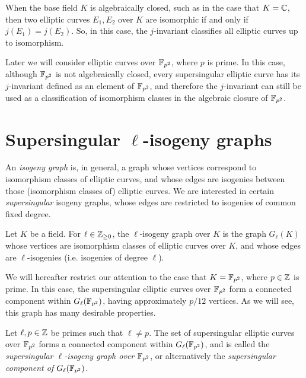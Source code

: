         When the base field $K$ is algebraically closed, such as in the case that $K = \mathbb{C}$, then two elliptic curves $E_1, E_2$ over $K$ are isomorphic if and only if $j(E_1) = j(E_2)$. So, in this case, the $j$-invariant classifies all elliptic curves up to isomorphism.

        Later we will consider elliptic curves over $\mathbb{F}_{p^2}$, where $p$ is prime. In this case, although $\mathbb{F}_{p^2}$ is not algebraically closed, every supersingular elliptic curve has its $j$-invariant defined as an element of $\mathbb{F}_{p^2}$, and therefore the $j$-invariant can still be used as a classification of isomorphism classes in the algebraic closure of $\mathbb{F}_{p^2}$.

    \section{Supersingular \texorpdfstring{$\ell$}{l}-isogeny graphs}
        An \textit{isogeny graph} is, in general, a graph whose vertices correspond to isomorphism classes of elliptic curves, and whose edges are isogenies between those (isomorphism classes of) elliptic curves. We are interested in certain \textit{supersingular} isogeny graphs, whose edges are restricted to isogenies of common fixed degree. 

        \begin{definition}
            Let $K$ be a field. For $\ell \in \mathbb{Z}_{\geq 0}$, the $\ell$-isogeny graph over $K$ is the graph $G_\ell(K)$ whose vertices are isomorphism classes of elliptic curves over $K$, and whose edges are $\ell$-isogenies (i.e. isogenies of degree $\ell$).
        \end{definition}

        We will hereafter restrict our attention to the case that $K = \mathbb{F}_{p^2}$, where $p \in \mathbb{Z}$ is prime. In this case, the supersingular elliptic curves over $\mathbb{F}_{p^2}$ form a connected component within $G_\ell(\mathbb{F}_{p^2})$, having approximately $p/12$ vertices. As we will see, this graph has many desirable properties.

        \begin{definition}
            Let $\ell, p \in \mathbb{Z}$ be primes such that $\ell \neq p$. The set of supersingular elliptic curves over $\mathbb{F}_{p^2}$ forms a connected component within $G_\ell(\mathbb{F}_{p^2})$, and is called the \textit{supersingular $\ell$-isogeny graph over $\mathbb{F}_{p^2}$}, or alternatively the \textit{supersingular component of $G_\ell(\mathbb{F}_{p^2})$}.
        \end{definition}

